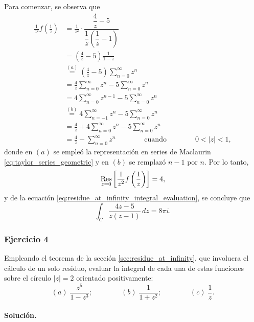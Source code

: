 \documentclass[a4paper]{report}
\def\Res{\qopname\relax m{Res}}
\begin{document}
Para comenzar, se observa que 
\begin{align*}
 \frac{1}{z^2}f\left(\frac{1}{z}\right)&=\frac{1}{z^2}\cdot\dfrac{\dfrac{4}{z}-5}{\dfrac{1}{z}\left(\dfrac{1}{z}-1\right)}\\
  &=\left(\frac{4}{z}-5\right)\frac{1}{1-z}\\
  &\overset{(a)}{=}\left(\frac{4}{z}-5\right)\sum_{n=0}^\infty z^n\\
  &=\frac{4}{z}\sum_{n=0}^\infty z^n-5\sum_{n=0}^\infty z^n\\
  &=4\sum_{n=0}^\infty z^{n-1}-5\sum_{n=0}^\infty z^n\\
  &\overset{(b)}{=}4\sum_{n=-1}^\infty z^{n}-5\sum_{n=0}^\infty z^n\\
  &=\frac{4}{z}+4\sum_{n=0}^\infty z^{n}-5\sum_{n=0}^\infty z^n\\
  &=\frac{4}{z}-\sum_{n=0}^\infty z^n
  \qquad\qquad\textrm{cuando}\qquad\qquad
  0<|z|<1,
\end{align*}
donde en \((a)\) se empleó la representación en series de Maclaurin \ref{eq:taylor_series_geometric} y en \((b)\) se remplazó \(n-1\) por \(n\). Por lo tanto,
\[
 \Res_{z=0}\left[\frac{1}{z^2}f\left(\frac{1}{z}\right)\right]=4,
\]
y de la ecuación \ref{eq:residue_at_infinity_integral_evaluation}, se concluye que 
\[
 \int_C\frac{4z-5}{z(z-1)}\,dz=8\pi i.
\]

\subsubsection*{Ejercicio 4}

Empleando el teorema de la sección \ref{sec:residue_at_infinity}, que involucra el cálculo de un solo residuo, evaluar la integral de cada una de estas funciones sobre el círculo \(|z|=2\) orientado positivamente:
\[
 (\textit{a})\;\frac{z^5}{1-z^3};\qquad\qquad (\textit{b})\;\frac{1}{1+z^2};\qquad\qquad
 (\textit{c})\;\frac{1}{z}.
\]

\paragraph{Solución.}
\end{document}
